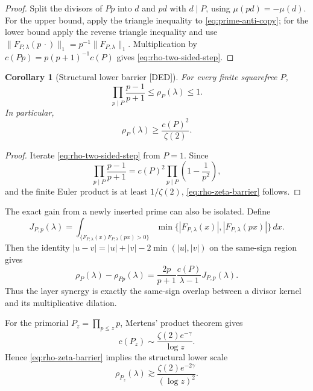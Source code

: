 \documentclass[11pt]{amsart}
\numberwithin{equation}{section}
\theoremstyle{plain}
\newtheorem{corollary}[theorem]{Corollary}
\theoremstyle{definition}
\theoremstyle{remark}
\newcommand{\Mob}{\mu}
\newcommand{\DED}{\textup{[DED]}}
\begin{document}
\begin{proof}
Split the divisors of $Pp$ into $d$ and $pd$ with $d\mid P$, using $\Mob(pd)=-\Mob(d)$.
For the upper bound, apply the triangle inequality to \eqref{eq:prime-anti-copy}; for the lower bound apply the reverse
triangle inequality and use
$\|F_{P,\lambda}(p\,\cdot)\|_1=p^{-1}\|F_{P,\lambda}\|_1$.  Multiplication by
$c(Pp)=p(p+1)^{-1}c(P)$ gives \eqref{eq:rho-two-sided-step}.
\end{proof}

\begin{corollary}[Structural lower barrier \DED]
\label{cor:rho-barrier}
For every finite squarefree $P$,
\begin{equation}
\prod_{p\mid P}\frac{p-1}{p+1}
\le
\rho_P(\lambda)
\le1.
\label{eq:rho-product-barrier}
\end{equation}
In particular,
\begin{equation}
\rho_P(\lambda)
\ge
\frac{c(P)^2}{\zeta(2)}.
\label{eq:rho-zeta-barrier}
\end{equation}
\end{corollary}

\begin{proof}
Iterate \eqref{eq:rho-two-sided-step} from $P=1$.  Since
\begin{equation}
\prod_{p\mid P}\frac{p-1}{p+1}
=c(P)^2\prod_{p\mid P}\left(1-\frac1{p^2}\right),
\label{eq:barrier-factorization}
\end{equation}
and the finite Euler product is at least $1/\zeta(2)$, \eqref{eq:rho-zeta-barrier} follows.
\end{proof}

The exact gain from a newly inserted prime can also be isolated.  Define
\begin{equation}
J_{P,p}(\lambda)
=
\int_{\{F_{P,\lambda}(x)F_{P,\lambda}(px)>0\}}
\min\{|F_{P,\lambda}(x)|,|F_{P,\lambda}(px)|\}\,dx.
\label{eq:overlap-functional}
\end{equation}
Then the identity $|u-v|=|u|+|v|-2\min(|u|,|v|)$ on the same-sign region gives
\begin{equation}
\rho_P(\lambda)-\rho_{Pp}(\lambda)
=
\frac{2p}{p+1}\frac{c(P)}{\lambda-1}J_{P,p}(\lambda).
\label{eq:rho-synergy}
\end{equation}
Thus the layer synergy is exactly the same-sign overlap between a divisor kernel and its multiplicative dilation.

For the primorial $P_z=\prod_{p\le z}p$, Mertens' product theorem gives
\begin{equation}
c(P_z)\sim\frac{\zeta(2)e^{-\gamma}}{\log z}.
\label{eq:c-primorial}
\end{equation}
Hence \eqref{eq:rho-zeta-barrier} implies the structural lower scale
\begin{equation}
\rho_{P_z}(\lambda)
\gtrsim
\frac{\zeta(2)e^{-2\gamma}}{(\log z)^2}.
\label{eq:rho-primorial-lower}
\end{equation}
\end{document}

